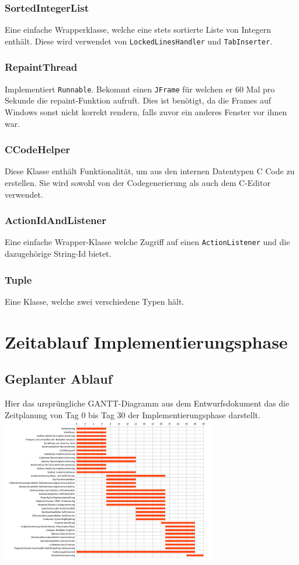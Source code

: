 \documentclass[a4paper]{scrreprt}
\begin{document}
\subsection{SortedIntegerList}
Eine einfache Wrapperklasse, welche eine stets sortierte Liste von Integern enthält. Diese wird verwendet von \verb!LockedLinesHandler! und \verb!TabInserter!.\\
\subsection{RepaintThread}
Implementiert \verb!Runnable!. Bekommt einen \verb!JFrame! für welchen er 60 Mal pro Sekunde die repaint-Funktion aufruft. Dies ist benötigt, da die Frames auf Windows sonst nicht korrekt rendern, falls zuvor ein anderes Fenster vor ihnen war.\\
\subsection{CCodeHelper}
Diese Klasse enthält Funktionalität, um aus den internen Datentypen C Code zu erstellen. Sie wird sowohl von der Codegenerierung als auch dem C-Editor verwendet. \\
\subsection{ActionIdAndListener}
Eine einfache Wrapper-Klasse welche Zugriff auf einen \verb!ActionListener! und die dazugehörige String-Id bietet.\\
\subsection{Tuple}
Eine Klasse, welche zwei verschiedene Typen hält.

\chapter{Zeitablauf Implementierungsphase}

\section{Geplanter Ablauf}
Hier das ursprüngliche GANTT-Diagramm aus dem Entwurfsdokument das die Zeitplanung von Tag 0 bis Tag 30 der Implementierungsphase darstellt.\\
\includegraphics[angle=270,width=0.7\textwidth] {originalPlanung.png}
\end{document}
